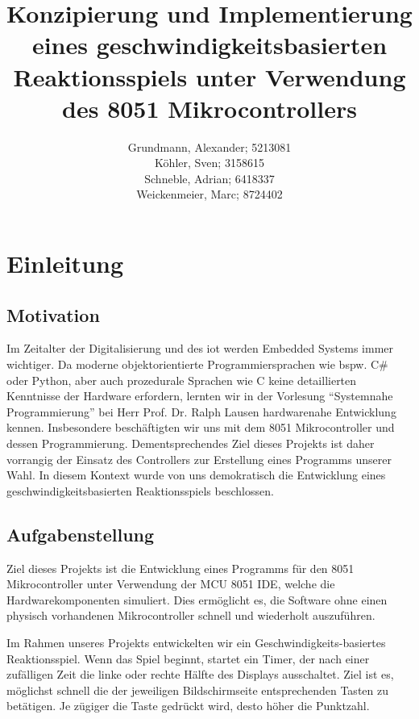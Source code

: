 \documentclass[11pt,ngerman]{report}
\title{Konzipierung und Implementierung eines geschwindigkeitsbasierten Reaktionsspiels unter Verwendung des 8051 Mikrocontrollers}
\author{Grundmann, Alexander; 5213081\\Köhler, Sven; 3158615\\Schneble, Adrian; 6418337\\Weickenmeier, Marc; 8724402}
\begin{document}
\maketitle

\tableofcontents


\chapter{Einleitung}

\section{Motivation}

Im Zeitalter der Digitalisierung und des \ac{iot} werden Embedded Systems immer wichtiger. Da moderne objektorientierte Programmiersprachen wie bspw. C\# oder Python, aber auch prozedurale Sprachen wie C keine detaillierten Kenntnisse der Hardware erfordern, lernten wir in der Vorlesung ``Systemnahe Programmierung'' bei Herr Prof. Dr. Ralph Lausen hardwarenahe Entwicklung kennen. Insbesondere beschäftigten wir uns mit dem 8051 Mikrocontroller und dessen Programmierung.
Dementsprechendes Ziel dieses Projekts ist daher vorrangig der Einsatz des Controllers zur Erstellung eines Programms unserer Wahl.
In diesem Kontext wurde von uns demokratisch die Entwicklung eines geschwindigkeitsbasierten Reaktionsspiels beschlossen.


\section{Aufgabenstellung}

Ziel dieses Projekts ist die Entwicklung eines Programms für den 8051 Mikrocontroller unter Verwendung der MCU 8051 IDE, welche die Hardwarekomponenten simuliert.
Dies ermöglicht es, die Software ohne einen physisch vorhandenen Mikrocontroller schnell und wiederholt auszuführen.

Im Rahmen unseres Projekts entwickelten wir ein Geschwindigkeits-basiertes Reaktionsspiel. Wenn das Spiel beginnt, startet ein Timer, der nach einer zufälligen Zeit die linke oder rechte Hälfte des Displays ausschaltet. Ziel ist es, möglichst schnell die der jeweiligen Bildschirmseite entsprechenden Tasten zu betätigen. Je zügiger die Taste gedrückt wird, desto höher die Punktzahl.


\end{document}
